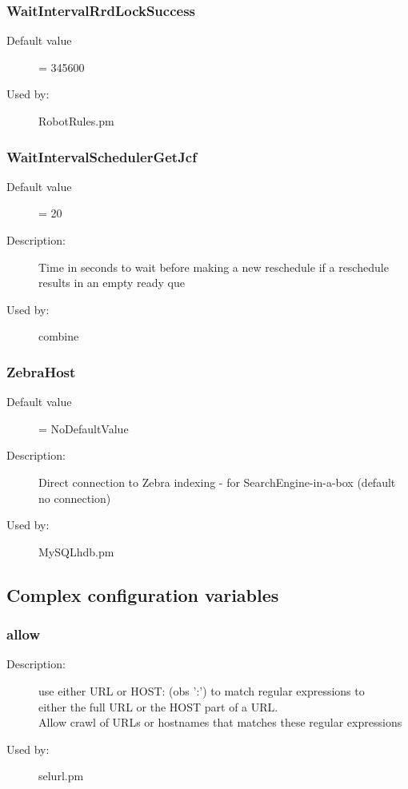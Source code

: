\subsubsection{WaitIntervalRrdLockSuccess}
\label{WaitIntervalRrdLockSuccess}
\begin{description}
\item[Default value] = 345600
\item[Used by:] RobotRules.pm
\end{description}
\subsubsection{WaitIntervalSchedulerGetJcf}
\label{WaitIntervalSchedulerGetJcf}
\begin{description}
\item[Default value] = 20
\item[Description:] Time in seconds to wait before making a new reschedule if a reschedule results in an empty ready que
\item[Used by:] combine
\end{description}
\subsubsection{ZebraHost}
\label{ZebraHost}
\begin{description}
\item[Default value] = NoDefaultValue
\item[Description:] Direct connection to Zebra indexing - for SearchEngine-in-a-box (default no connection)
\item[Used by:] MySQLhdb.pm
\end{description}
\subsection{Complex configuration variables}
\subsubsection{allow}
\label{allow}
\begin{description}
\item[Description:] use either URL or HOST: (obs ':') to match regular expressions to \\  either the full URL or the HOST part of a URL. \\ Allow crawl of URLs or hostnames that matches these regular expressions
\item[Used by:] selurl.pm
\end{description}
